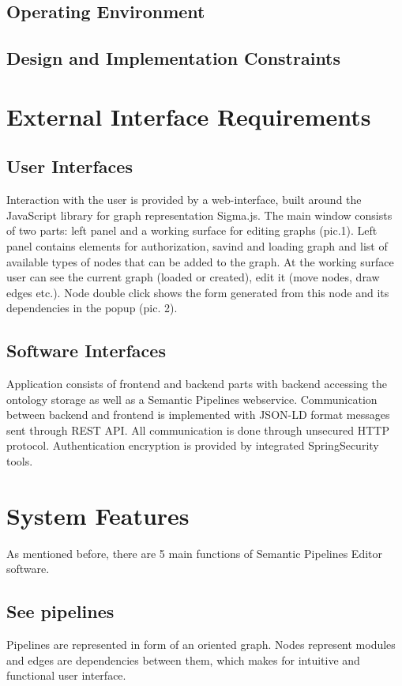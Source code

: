 \documentclass{article}
\begin{document}
\subsection{Operating Environment}
\subsection{Design and Implementation Constraints}
\section{External Interface Requirements}
\subsection{User Interfaces}
Interaction with the user is provided by a web-interface, built around the JavaScript library for graph representation Sigma.js. The main window consists of two parts: left panel and a working surface for editing graphs (pic.1). Left panel contains elements for authorization, savind and loading graph and list of available types of nodes that can be added to the graph. At the working surface user can see the current graph (loaded or created), edit it (move nodes, draw edges etc.). Node double click shows the form generated from this node and its dependencies in the popup (pic. 2).
\subsection{Software Interfaces}
Application consists of frontend and backend parts with backend accessing the ontology storage as well as a Semantic Pipelines webservice. Communication between backend and frontend is implemented with JSON-LD format messages sent through REST API. All communication is done through unsecured HTTP protocol. Authentication encryption is provided by integrated SpringSecurity tools. 
\section{System Features}
\label{sec:features}
As mentioned before, there are 5 main functions of Semantic Pipelines Editor software.
\subsection{See pipelines}
Pipelines are represented in form of an oriented graph. Nodes represent modules and edges are dependencies between them, which makes for intuitive and functional user interface.
\end{document}
